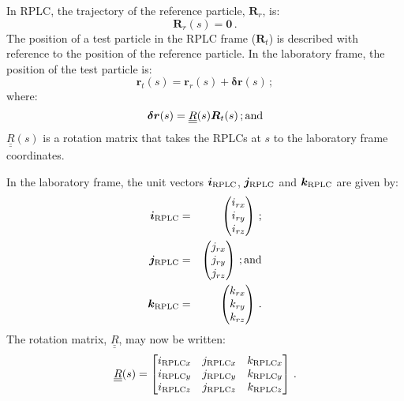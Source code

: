 In RPLC, the trajectory of the reference particle, $\bm{R}_r$, is:
\begin{equation}
  \bm{R}_r(s) = \bm{0}\,.
\end{equation}
The position of a test particle in the RPLC frame ($\bm{R}_{t}$) is
described with reference to the position of the reference particle.
In the laboratory frame, the position of the test particle is:
\begin{equation}
  \bm{r}_{t}(s) = \bm{r}_r(s) + \bm{\delta r}(s) \,;
\end{equation}
where:
\begin{equation}
  \bm{\delta r}(s) = \underline{\underline{R}}(s) \bm{R}_t(s) \,{\rm ; and}
\end{equation}
$\underline{\underline{R}}(s)$ is a rotation matrix that takes
the RPLCs at $s$ to the laboratory frame coordinates.

In the laboratory frame, the unit vectors $\bm{i}_{\rm RPLC}$,
$\bm{j}_{\rm RPLC}$ and $\bm{k}_{\rm RPLC}$ are given by:
\begin{eqnarray}
  \bm{i}_{\rm RPLC} & = & \begin{pmatrix} i_{rx} \\ i_{ry} \\  i_{rz} \\ \end{pmatrix} \,;           \nonumber \\
  \bm{j}_{\rm RPLC} & = & \begin{pmatrix} j_{rx} \\ j_{ry} \\  j_{rz} \\ \end{pmatrix} \,{\rm ; and}           \\
  \bm{k}_{\rm RPLC} & = & \begin{pmatrix} k_{rx} \\ k_{ry} \\  k_{rz} \\ \end{pmatrix} \,.           \nonumber
\end{eqnarray}
The rotation matrix, $\underline{\underline{R}}$, may now be written:
\begin{equation}
  \underline{\underline{R}}(s) =
    \begin{bmatrix}
      i_{{\rm RPLC}x} & j_{{\rm RPLC}x} & k_{{\rm RPLC}x} \\
      i_{{\rm RPLC}y} & j_{{\rm RPLC}y} & k_{{\rm RPLC}y} \\
      i_{{\rm RPLC}z} & j_{{\rm RPLC}z} & k_{{\rm RPLC}z}
    \end{bmatrix} \,.
\end{equation}
